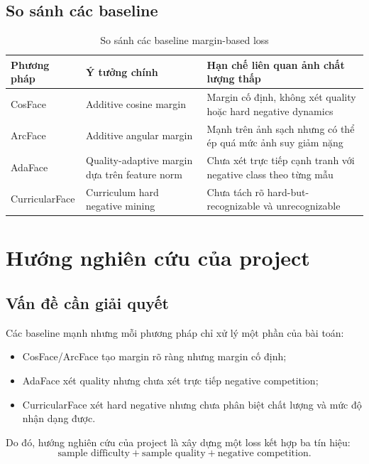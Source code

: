 \documentclass[13pt,a4paper]{extreport}
\begin{document}
\section{So sánh các baseline}
\begin{table}[H]
\centering
\caption{So sánh các baseline margin-based loss}
\begin{tabular}{p{3cm}p{4cm}p{5cm}}
\toprule
\textbf{Phương pháp} & \textbf{Ý tưởng chính} & \textbf{Hạn chế liên quan ảnh chất lượng thấp}\\
\midrule
CosFace & Additive cosine margin & Margin cố định, không xét quality hoặc hard negative dynamics\\
ArcFace & Additive angular margin & Mạnh trên ảnh sạch nhưng có thể ép quá mức ảnh suy giảm nặng\\
AdaFace & Quality-adaptive margin dựa trên feature norm & Chưa xét trực tiếp cạnh tranh với negative class theo từng mẫu\\
CurricularFace & Curriculum hard negative mining & Chưa tách rõ hard-but-recognizable và unrecognizable\\
\bottomrule
\end{tabular}
\end{table}

\chapter{Hướng nghiên cứu của project}

\section{Vấn đề cần giải quyết}
Các baseline mạnh nhưng mỗi phương pháp chỉ xử lý một phần của bài toán:
\begin{itemize}[leftmargin=1.2cm]
    \item CosFace/ArcFace tạo margin rõ ràng nhưng margin cố định;
    \item AdaFace xét quality nhưng chưa xét trực tiếp negative competition;
    \item CurricularFace xét hard negative nhưng chưa phân biệt chất lượng và mức độ nhận dạng được.
\end{itemize}

Do đó, hướng nghiên cứu của project là xây dựng một loss kết hợp ba tín hiệu:
\begin{equation}
    \text{sample difficulty} + \text{sample quality} + \text{negative competition}.
\end{equation}
\end{document}
